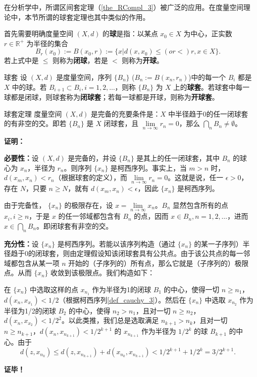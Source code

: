 在分析学中，所谓区间套定理（\autoref{the_RCompl_3}）被广泛的应用。在度量空间理论中，本节所谓的球套定理也其中类似的作用。

首先需要明确度量空间 $(X,d)$ 的\textbf{球}是指：以某点 $x_0\in X$ 为中心，正实数 $r\in\mathbb R^+$ 为半径的集合 
\begin{equation}
B_{r}(x_0):=B(x_0,r):=\{x|d(x,x_0)\leq(or <)r,x\in X\}.~
\end{equation}
若上式中是 $\leq$ 则称为\textbf{闭球}，若是 $<$ 则称为\textbf{开球}。
\begin{definition}{球套}
设 $(X,d)$ 是度量空间，序列 $\{B_n\}$ ($B_n:=B(x_n,r_n)$)中的每一个 $B_i$ 都是 $X$ 中的球。若 $B_{i+1}\subset B_{i},i=1,2,\ldots$，则称 $\{B_n\}$ 为 $X$ 上的\textbf{球套}。若球套中每一球都是闭球，则球套称为\textbf{闭球套}；若每一球都是开球，则称为\textbf{开球套}。
\end{definition}

\begin{theorem}{球套定理}
度量空间 $(X,d)$ 是完备的充要条件是：$X$ 中半径趋于0的任一闭球套的有非空的交。即若 $\{B_n\}$ 是 $X$ 闭球套，且 $\lim\limits_{n\rightarrow\infty}r_n=0$，那么 $\bigcap\limits_n B_n\neq\emptyset$。
\end{theorem}

\textbf{证明：}

\textbf{必要性：}设 $(X,d)$ 是完备的，并设 $\{B_n\}$ 是其上的任一闭球套，其中 $B_n$ 的球心为 $x_n$，半径为 $r_n$。则序列 $\{x_n\}$ 是柯西序列。事实上，当 $m>n$ 时，$d(x_m,x_n)<r_n$（根据球套的定义），而 $\lim\limits_{n\rightarrow\infty}r_n=0$。这就是说，任一 $\epsilon>0$，存在 $N$，只要 $n\geq N$，就有 $d(x_m,x_n)<\epsilon$，因此 $\{x_n\}$ 是柯西序列。

由于完备性， $\{x_n\}$ 的极限存在，设 $x=\lim\limits_{n\rightarrow\infty}x_n$。$B_n$ 显然包含所有的点 $x_i,i\geq n$，于是 $x$ 的任一邻域都包含有 $B_n$ 的点，因而 $x\in B_n,n=1,2,\ldots$，进而
$x\in\bigcap\limits_n B_n$。即闭球套有非空的交。

\textbf{充分性：}设 $\{x_n\}$ 是柯西序列。若能以该序列构造（通过 $\{x_n\}$ 的某一子序列）半径趋于0的闭球套，则由定理假设知该闭球套具有公共点。由于该公共点的每一邻域都包含从某一项 $n$ 开始的（子序列的）所有点，那么它就是（子序列的）极限点。从而 $\{x_n\}$ 收敛到该极限点。我们构造如下：

在 $\{x_n\}$ 中选取这样的点 $x_{n_1}$ 作为半径为1的闭球 $B_1$ 的中心，使得一切 $n\geq n_1$，$d(x_n,x_{x_1})<1/2$（根据柯西序列\autoref{def_cauchy_3}）。然后在 $\{x_n\}$ 中选取 $x_{n_2}$ 作为半径为1/2的闭球 $B_2$ 的中心，使得 $n_2>n_1$，且对一切 $n\geq n_2$，$d(x_n,x_{x_2})<1/2^2$。以此类推，我们总是选取满足 $n_{k+1}>n_k$，且对一切 $n\geq n_{k+1}$，$d(x_n,x_{n_{k+1}})<1/2^{k+1}$ 的 $x_{n_{k+1}}$ 作为半径为 $1/2^k$ 的球 $B_{k+1}$ 的中心。由于
\begin{equation}
d(z,x_{n_k})\leq d(z,x_{n_{k+1}})+d(x_{n_k},x_{n_{k+1}})<1/2^{k+1}+1/2^k=3/2^{k+1}.~
\end{equation}


\textbf{证毕！}









